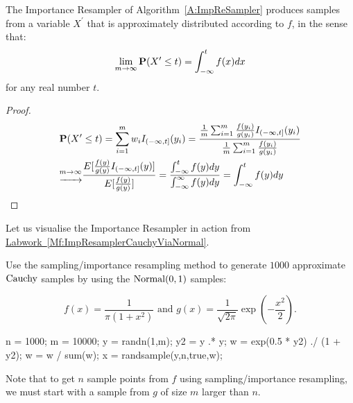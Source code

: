 \begin{prop}The Importance Resampler of Algorithm~\ref{A:ImpReSampler} produces samples from a variable $X^{\prime}$ that is approximately distributed according to $f$, in the sense that:
\begin{equation}
\lim_{m\rightarrow \infty}\mathbf{P}( X^{\prime} \leq t)=\int^t_{-\infty}f(x)dx
\end{equation}
for any real number $t$.
\begin{proof}
\begin{displaymath}
\begin{split}
&\mathbf{P}(X^{\prime}\leq t)=\sum^m_{i=1}w_iI_{(-\infty,t]}(y_i)=\frac{\frac{1}{m}\sum^m_{i=1}\frac{f(y_i)}{g(y_i)}I_{(-\infty,t]}(y_i)}{\frac{1}{m}\sum^m_{i=1}\frac{f(y_i)}{g(y_i)}}\\
&\underrightarrow{^{m\rightarrow\infty}}\frac{E [\frac{f(y)}{g(y)}I_{(-\infty,t]}(y)]}{E[\frac{f(y)}{g(y)}]}=\frac{\int^t_{-\infty}f(y)dy}{{\int^{\infty}_{-\infty}f(y)dy}}=\int^t_{-\infty}f(y)dy\\
\end{split}
\end{displaymath}
\end{proof}
\end{prop}

Let us visualise the Importance Resampler in action from \hyperref[Mf:ImpResamplerCauchyViaNormal]{Labwork~\ref*{Mf:ImpResamplerCauchyViaNormal}}.

\begin{labwork}
Use the sampling/importance resampling method to generate $1000$ approximate $\mbox{{\rm Cauchy}}$ samples  by using the $\mbox{{\rm Normal}}(0,1)$ samples:

$$f(x)=\frac{1}{\pi(1+x^2)} \textrm{ and  } g(x)=\frac{1}{\sqrt{2\pi}}\exp\left(-\frac{x^2}{2}\right).$$

\begin{VrbM}
n = 1000;
m = 10000;
y = randn(1,m); %
y2 = y .* y;
w = exp(0.5 * y2) ./ (1 + y2);
w = w / sum(w);
x = randsample(y,n,true,w); %
\end{VrbM}
\end{labwork}

Note that to get $n$ sample points from $f$ using sampling/importance resampling, we must start with a sample from $g$ of size $m$ larger than $n$.

